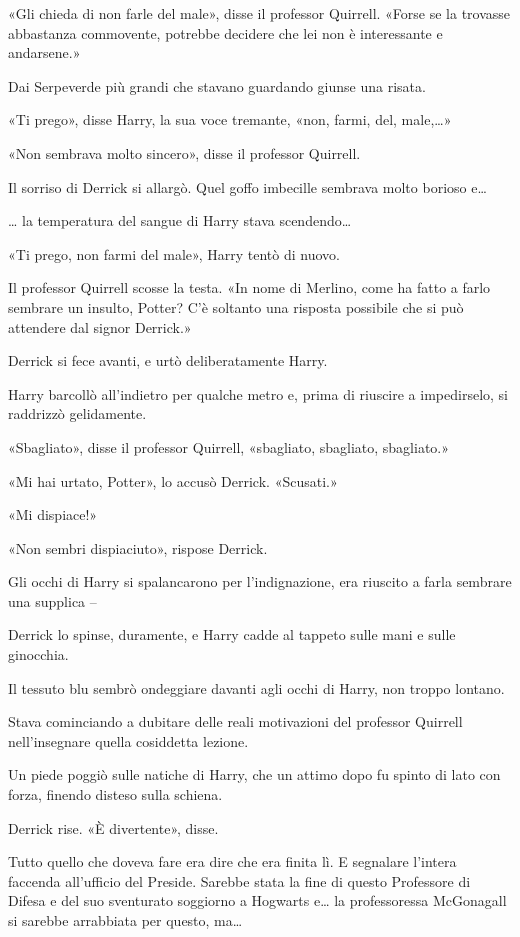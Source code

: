 «Gli chieda di non farle del male», disse il professor Quirrell. «Forse se la trovasse abbastanza commovente, potrebbe decidere che lei non è interessante e andarsene.»

Dai Serpeverde più grandi che stavano guardando giunse una risata.

«Ti prego», disse Harry, la sua voce tremante, «non, farmi, del, male,…»

«Non sembrava molto sincero», disse il professor Quirrell.

Il sorriso di Derrick si allargò. Quel goffo imbecille sembrava molto borioso e…

… la temperatura del sangue di Harry stava scendendo…

«Ti prego, non farmi del male», Harry tentò di nuovo.

Il professor Quirrell scosse la testa. «In nome di Merlino, come ha fatto a farlo sembrare un insulto, Potter? C’è soltanto una risposta possibile che si può attendere dal signor Derrick.»

Derrick si fece avanti, e urtò deliberatamente Harry.

Harry barcollò all’indietro per qualche metro e, prima di riuscire a impedirselo, si raddrizzò gelidamente.

«Sbagliato», disse il professor Quirrell, «sbagliato, sbagliato, sbagliato.»

«Mi hai urtato, Potter», lo accusò Derrick. «Scusati.»

«Mi dispiace!»

«Non sembri dispiaciuto», rispose Derrick.

Gli occhi di Harry si spalancarono per l’indignazione, era riuscito a farla sembrare una supplica –

Derrick lo spinse, duramente, e Harry cadde al tappeto sulle mani e sulle ginocchia.

Il tessuto blu sembrò ondeggiare davanti agli occhi di Harry, non troppo lontano.

Stava cominciando a dubitare delle reali motivazioni del professor Quirrell nell’insegnare quella cosiddetta lezione.

Un piede poggiò sulle natiche di Harry, che un attimo dopo fu spinto di lato con forza, finendo disteso sulla schiena.

Derrick rise. «È divertente», disse.

Tutto quello che doveva fare era dire che era finita lì. E segnalare l’intera faccenda all’ufficio del Preside. Sarebbe stata la fine di questo Professore di Difesa e del suo sventurato soggiorno a Hogwarts e… la professoressa McGonagall si sarebbe arrabbiata per questo, ma…

